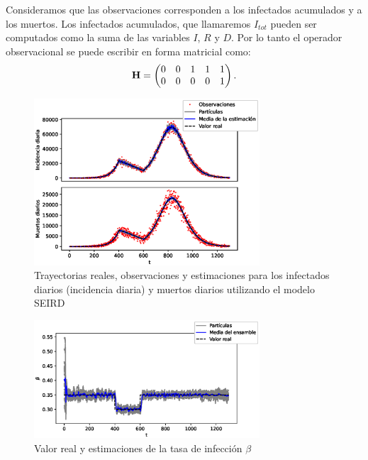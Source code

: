 Consideramos que las observaciones corresponden a los infectados acumulados y a los muertos. Los infectados acumulados, que llamaremos $I_{tot}$ pueden ser computados como la suma de las variables $I$, $R$ y $D$. Por lo tanto el operador observacional se puede escribir en forma matricial como:
\begin{align*}
    \mathbf{H} = 
    \begin{pmatrix}
        0 & 0 & 1 & 1 & 1 \\
        0 & 0 & 0 & 0 & 1 
    \end{pmatrix}.
\end{align*}
\begin{figure}[h]
    \centering
    \includegraphics[width=0.75\textwidth]{figs/seird_online_em_aug_state_state_vars.eps}
    \caption{Trayectorias reales, observaciones y estimaciones para los infectados diarios (incidencia diaria) y muertos diarios utilizando el modelo SEIRD}
    \label{fig:seird_online_em_aug_state_state_vars}
\end{figure}
\begin{figure}[h]
    \centering
    \includegraphics[width=0.75\textwidth]{figs/seird_online_em_aug_state_beta.eps}
    \caption{Valor real y estimaciones de la tasa de infección $\beta$}
    \label{fig:seird_online_em_aug_state_beta}
\end{figure}

